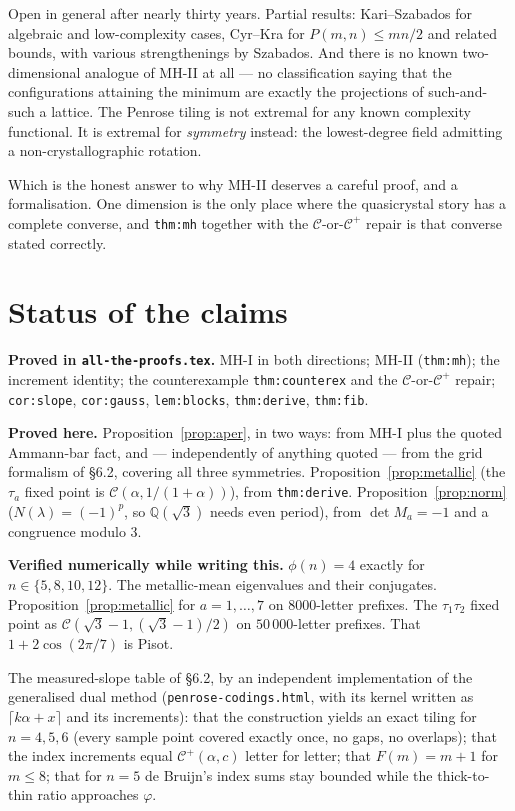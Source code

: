 \documentclass[11pt,a4paper]{article}
\newcommand{\C}{\mathcal{C}}
\newcommand{\Cp}{\mathcal{C}^{+}}
\newcommand{\Q}{\mathbb{Q}}
\theoremstyle{definition}
\theoremstyle{plain}
\begin{document}
Open in general after nearly thirty years. Partial results: Kari--Szabados for
algebraic and low-complexity cases, Cyr--Kra for $P(m,n) \leq mn/2$ and related
bounds, with various strengthenings by Szabados. And there is no known
two-dimensional analogue of MH-II at all --- no classification saying that the
configurations attaining the minimum are exactly the projections of
such-and-such a lattice. The Penrose tiling is not extremal for any known
complexity functional. It is extremal for \emph{symmetry} instead: the
lowest-degree field admitting a non-crystallographic rotation.

Which is the honest answer to why MH-II deserves a careful proof, and a
formalisation. One dimension is the only place where the quasicrystal story has
a complete converse, and \texttt{thm:mh} together with the
$\C$-or-$\Cp$ repair is that converse stated correctly.

\section{Status of the claims}\label{sec:status}

\textbf{Proved in \texttt{all-the-proofs.tex}.} MH-I in both directions; MH-II
(\texttt{thm:mh}); the increment identity; the counterexample
\texttt{thm:counterex} and the $\C$-or-$\Cp$ repair; \texttt{cor:slope},
\texttt{cor:gauss}, \texttt{lem:blocks}, \texttt{thm:derive},
\texttt{thm:fib}.

\textbf{Proved here.} Proposition~\ref{prop:aper}, in two ways: from MH-I plus
the quoted Ammann-bar fact, and --- independently of anything quoted --- from
the grid formalism of \S6.2, covering all three symmetries.
Proposition~\ref{prop:metallic} (the $\tau_a$ fixed point is
$\C(\alpha, 1/(1+\alpha))$), from \texttt{thm:derive}.
Proposition~\ref{prop:norm} ($N(\lambda) = (-1)^p$, so $\Q(\sqrt 3)$ needs even
period), from $\det M_a = -1$ and a congruence modulo $3$.

\textbf{Verified numerically while writing this.} $\phi(n) = 4$ exactly for
$n \in \{5,8,10,12\}$. The metallic-mean eigenvalues and their conjugates.
Proposition~\ref{prop:metallic} for $a = 1,\dots,7$ on $8000$-letter prefixes.
The $\tau_1\tau_2$ fixed point as $\C(\sqrt 3 - 1, (\sqrt 3 - 1)/2)$ on
$50\,000$-letter prefixes. That $1+2\cos(2\pi/7)$ is Pisot.

The measured-slope table of \S6.2, by an independent implementation of the
generalised dual method (\texttt{penrose-codings.html}, with its kernel written
as $\lceil k\alpha + x\rceil$ and its increments): that the construction yields
an exact tiling for $n = 4,5,6$ (every sample point covered exactly once, no
gaps, no overlaps); that the index increments equal $\Cp(\alpha,c)$ letter for
letter; that $F(m) = m+1$ for $m \leq 8$; that for $n = 5$ de Bruijn's index
sums stay bounded while the thick-to-thin ratio approaches $\varphi$.
\end{document}
